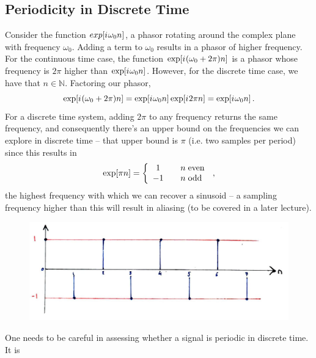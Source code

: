\subsection{Periodicity in Discrete Time}
%
Consider the function $exp[{i\mkern1mu}\omega_0 n]$, a phasor rotating around the complex plane with frequency
$\omega_0$. Adding a term to $\omega_0$ results in a phasor of higher frequency. For the continuous
time case, the function $\exp[{i\mkern1mu}(\omega_0 + 2\pi)n]$ is a phasor whose frequency is $2\pi$ higher
than $\exp[{i\mkern1mu}\omega_0 n]$. However, for the discrete time case, we have that $n\in\mathbb{N}$.
Factoring our phasor,
%
\begin{displaymath}
  \exp[{i\mkern1mu}(\omega_0 + 2\pi)n] = \exp[{i\mkern1mu}\omega_0n]\exp[{i\mkern1mu} 2\pi n] = \exp[{i\mkern1mu}\omega_0n] \,.
\end{displaymath}
%
For a discrete time system, adding $2\pi$ to any frequency returns the same frequency, and
consequently there's an upper bound on the frequencies we can explore in discrete time -- that
upper bound is $\pi$ (i.e. two samples per period) since this results in
%
\begin{displaymath}
  \exp[\pi n] = \left\{\begin{array}{ccl}
  1 & & n\hspace{1mm}\mathrm{even} \\
  -1 & & n\hspace{1mm}\mathrm{odd} \\
  \end{array}\right. \,,
\end{displaymath}
%
the highest frequency with which we can recover a sinusoid -- a sampling frequency
higher than this will result in aliasing (to be covered in a later lecture).
%
\begin{figure}[!htb]
  \includegraphics[width=\textwidth]{images/lecture_1_discrete_sampling.JPG}
  \caption{
  }
  \label{fig::lecture_1_discrete_sampling}
\end{figure}
%
One needs to be careful in assessing whether a signal is periodic in discrete time. It is
